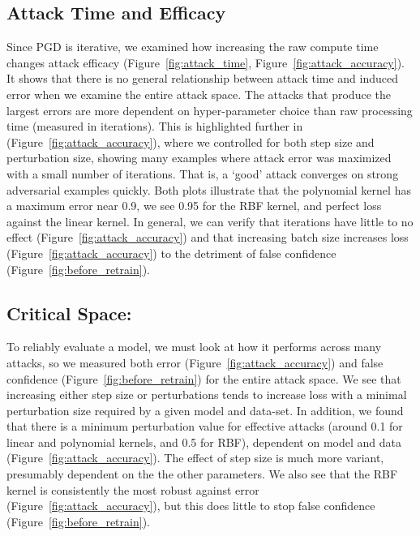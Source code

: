 \documentclass[fonts]{icst}
\begin{document}
\subsection{Attack Time and Efficacy}
Since PGD is iterative, we examined how increasing the raw compute time changes attack efficacy (Figure~\ref{fig:attack_time}, Figure~\ref{fig:attack_accuracy}).
It shows that there is no general relationship between attack time and induced error when we examine the entire attack space.
The attacks that produce the largest errors are more dependent on hyper-parameter choice than raw processing time (measured in iterations).
This is highlighted further in (Figure~\ref{fig:attack_accuracy}), where we controlled for both step size and perturbation size, showing many examples where attack error was maximized with a small number of iterations.
That is, a `good' attack converges on strong adversarial examples quickly.
Both plots illustrate that the polynomial kernel has a maximum error near 0.9, we see 0.95 for the RBF kernel, and perfect loss against the linear kernel.
In general, we can verify that iterations have little to no effect (Figure~\ref{fig:attack_accuracy})  and that increasing batch size increases loss (Figure~\ref{fig:attack_accuracy}) to the detriment of false confidence (Figure~\ref{fig:before_retrain}).


\subsection{Critical Space: }
To reliably evaluate a model, we must look at how it performs across many attacks, so we measured both error (Figure~\ref{fig:attack_accuracy}) and false confidence (Figure~\ref{fig:before_retrain}) for the entire attack space.
We see that increasing either step size or perturbations tends to increase loss with a minimal perturbation size required by a given model and data-set.
In addition, we found that there is a minimum perturbation value for effective attacks (around 0.1 for linear and polynomial kernels, and 0.5 for RBF), dependent on model and data (Figure~\ref{fig:attack_accuracy}).
The effect of step size is much more variant, presumably dependent on the the other parameters.
We also see that the RBF kernel is consistently the most robust against error (Figure~\ref{fig:attack_accuracy}), but this does little to stop false confidence (Figure~\ref{fig:before_retrain}).
\end{document}
